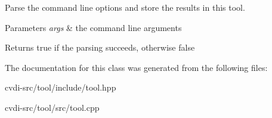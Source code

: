 Parse the command line options and store the results in this tool. 


\begin{DoxyParams}{Parameters}
{\em args} & the command line arguments \\
\hline
\end{DoxyParams}
\begin{DoxyReturn}{Returns}
true if the parsing succeeds, otherwise false 
\end{DoxyReturn}


The documentation for this class was generated from the following files\+:\begin{DoxyCompactItemize}
\item 
cvdi-\/src/tool/include/tool.\+hpp\item 
cvdi-\/src/tool/src/tool.\+cpp\end{DoxyCompactItemize}
